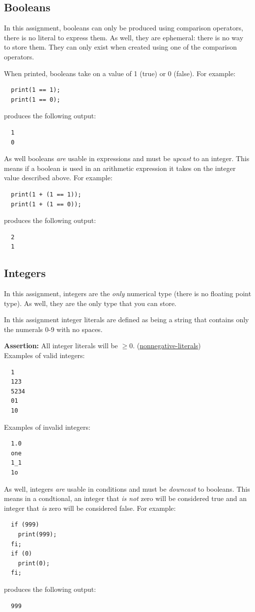 \documentclass{article}
\newcommand{\assertion}[2]{\textbf{Assertion: }#1 (\hyperlink{#2}{#2})}
\begin{document}
\subsection{Booleans}
In this assignment, booleans can only be produced using comparison operators, there is no literal to
express them. As well, they are ephemeral: there is no way to store them. They can only exist when
created using one of the comparison operators.

When printed, booleans take on a value of 1 (true) or 0 (false). For example:
\begin{lstlisting}
  print(1 == 1);
  print(1 == 0);
\end{lstlisting}
produces the following output:
\begin{lstlisting}
  1
  0
\end{lstlisting}

As well booleans \textit{are} usable in expressions and must be \textit{upcast} to an integer.
This means if a boolean is used in an arithmetic expression it takes on the integer value described
above. For example:
\begin{lstlisting}
  print(1 + (1 == 1));
  print(1 + (1 == 0));
\end{lstlisting}
produces the following output:
\begin{lstlisting}
  2
  1
\end{lstlisting}

\subsection{Integers}
In this assignment, integers are the \textit{only} numerical type (there is no floating point type).
As well, they are the only type that you can store.

In this assignment integer literals are defined as being a string that contains only the numerals
0-9 with no spaces.

\assertion{All integer literals will be $\geq 0$.}{nonnegative-literals}\\

Examples of valid integers:
\begin{lstlisting}
  1
  123
  5234
  01
  10
\end{lstlisting}

Examples of invalid integers:
\begin{lstlisting}
  1.0
  one
  1_1
  1o
\end{lstlisting}

As well, integers \textit{are} usable in conditions and must be \textit{downcast} to booleans. This
means in a condtional, an integer that \textit{is not} zero will be considered true and an integer
that \textit{is} zero will be considered false. For example:
\begin{lstlisting}
  if (999)
    print(999);
  fi;
  if (0)
    print(0);
  fi;
\end{lstlisting}
produces the following output:
\begin{lstlisting}
  999
\end{lstlisting}
\end{document}
